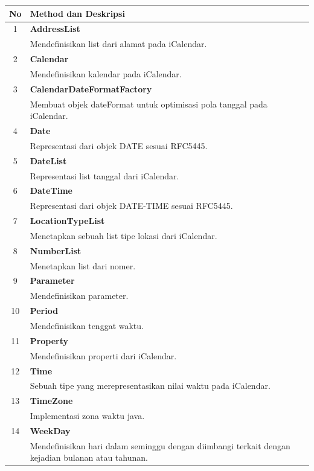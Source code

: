 	\begin{tabular}{|c|p{12cm}|}
		\hline
		\textbf{No} & \textbf{Method dan Deskripsi} \\ \hline \hline
		1 & \textbf{AddressList}\\
			&	Mendefinisikan list dari alamat pada iCalendar.\\ \hline
		2 & \textbf{Calendar}\\
			&	Mendefinisikan kalendar pada iCalendar. \\ \hline
		3 & \textbf{CalendarDateFormatFactory}\\
			&	Membuat objek dateFormat untuk optimisasi pola tanggal pada iCalendar.\\ \hline
		4 & \textbf{Date}\\
			&	Representasi dari objek DATE sesuai RFC5445.\\ \hline
		5 & \textbf{DateList}\\
			&	Representasi list tanggal dari iCalendar.\\ \hline
		6 & \textbf{DateTime}\\
			&	Representasi dari objek DATE-TIME sesuai RFC5445.\\ \hline
		7 & \textbf{LocationTypeList}\\
			&	Menetapkan sebuah list tipe lokasi dari iCalendar.\\ \hline
		8 & \textbf{NumberList}\\
			&	Menetapkan list dari nomer.\\ \hline
		9 & \textbf{Parameter}\\
			&	Mendefinisikan parameter.\\ \hline
		10 & \textbf{Period}\\
			&	Mendefinisikan tenggat waktu.\\ \hline
		11 & \textbf{Property}\\
			&	Mendefinisikan properti dari iCalendar.\\ \hline		12 & \textbf{Time}\\
			&	Sebuah tipe yang merepresentasikan nilai waktu pada iCalendar.\\ \hline
		13 & \textbf{TimeZone}\\
			&	Implementasi zona waktu java.\\ \hline
		14 & \textbf{WeekDay}\\
			&	Mendefinisikan hari dalam seminggu dengan diimbangi terkait dengan kejadian bulanan atau tahunan.\\ \hline	
	\end{tabular}
	
